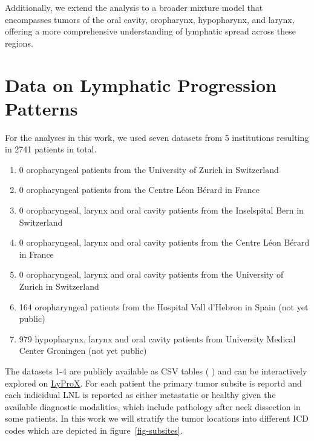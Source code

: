 \documentclass[
  sn-mathphys-num,
]{sn-jnl}
\providecommand{\tightlist}{%
  \setlength{\itemsep}{0pt}\setlength{\parskip}{0pt}}\usepackage{longtable,booktabs,array}
\begin{document}
Additionally, we extend the analysis to a broader mixture model that
encompasses tumors of the oral cavity, oropharynx, hypopharynx, and
larynx, offering a more comprehensive understanding of lymphatic spread
across these regions.

\section{Data on Lymphatic Progression Patterns}\label{sec-data}

For the analyses in this work, we used seven datasets from 5
institutions resulting in 2741 patients in total.

\begin{enumerate}
\def\labelenumi{\arabic{enumi}.}
\tightlist
\item
  0 oropharyngeal patients from the University of Zurich in Switzerland
\item
  0 oropharyngeal patients from the Centre Léon Bérard in France
\item
  0 oropharyngeal, larynx and oral cavity patients from the Inselspital
  Bern in Switzerland
\item
  0 oropharyngeal, larynx and oral cavity patients from the Centre Léon
  Bérard in France
\item
  0 oropharyngeal, larynx and oral cavity patients from the University
  of Zurich in Switzerland
\item
  164 oropharyngeal patients from the Hospital Vall d'Hebron in Spain
  (not yet public)
\item
  979 hypopharynx, larynx and oral cavity patients from University
  Medical Center Groningen (not yet public)
\end{enumerate}

The datasets 1-4 are publicly available as CSV tables
(\citet{ludwig_multi-centric_2023} \citet{ludwig_detailed_2022}) and can
be interactively explored on \href{https://lyprox.org}{LyProX}. For each
patient the primary tumor subsite is reportd and each indicidual LNL is
reported as either metastatic or healthy given the available diagnostic
modalities, which include pathology after neck dissection in some
patients. In this work we will stratify the tumor locations into
different ICD codes which are depicted in figure~\ref{fig-subsites}.
\end{document}
